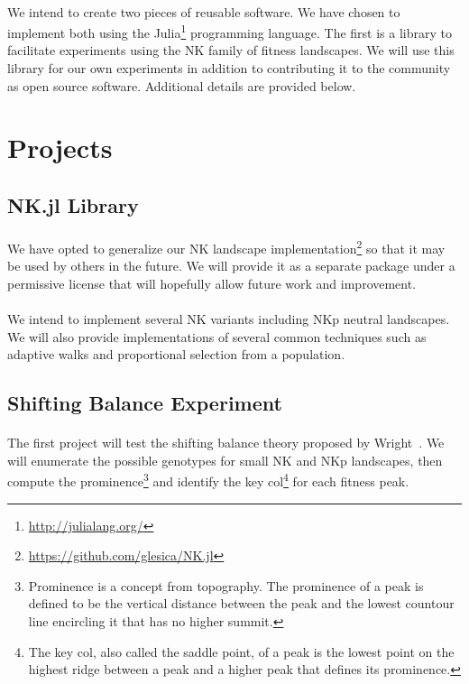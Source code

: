\documentclass[12pt,letterpaper,titlepage,draft]{article}
\begin{document}
\paragraph{}
We intend to create two pieces of reusable software. We have chosen to
implement both using the Julia\footnote{\url{http://julialang.org/}}
programming language. The first is a library to facilitate experiments using
the NK family of fitness landscapes. We will use this library for our own
experiments in addition to contributing it to the community as open source
software. Additional details are provided below.

\section{Projects}

\subsection{NK.jl Library}

\paragraph{}
We have opted to generalize our NK landscape
implementation\footnote{\url{https://github.com/glesica/NK.jl}} so that it may
be used by others in the future. We will provide it as a separate package under
a permissive license that will hopefully allow future work and improvement.

\paragraph{}
We intend to implement several NK variants including NKp neutral landscapes. We
will also provide implementations of several common techniques such as adaptive
walks and proportional selection from a population.

\subsection{Shifting Balance Experiment}

\paragraph{}
The first project will test the shifting balance theory proposed by
Wright~\cite{Wright1982}\cite{Wright1931}. We will enumerate the possible
genotypes for small NK and NKp landscapes, then compute the
prominence\footnote{Prominence is a concept from topography. The prominence of
a peak is defined to be the vertical distance between the peak and the
lowest countour line encircling it that has no higher summit.} and identify the
key col\footnote{The key col, also called the saddle point, of a peak is the
lowest point on the highest ridge between a peak and a higher peak that
defines its prominence.} for each fitness peak.
\end{document}
